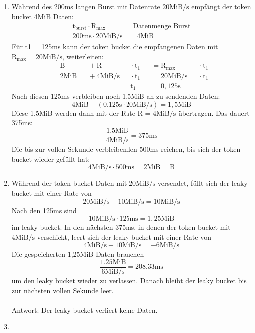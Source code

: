 \documentclass[a4paper,
			llpt,
			solution,
			accentcolor=tud2d,
			colorbacktitle
			]
			{tudexercise}
\newcommand{\MiBs}{\mathrm{MiB}/\mathrm{s}}
\begin{document}
\subsection{}
\begin{enumerate}
\item
\begin{multicols}{2}
Während des 200ms langen Burst mit Datenrate $20\MiBs$ empfängt der token bucket 4MiB Daten: 
\begin{align*}
\text{t}_\text{burst}  \cdot \text{R}_\text{max} &= \text{Datenmenge Burst}
\\
200\mathrm{ms} \cdot 20\MiBs &= \mathrm{4MiB}
\end{align*}
Für t1 = 125ms kann der token bucket die empfangenen Daten mit $\mathrm{R}_{\mathrm{max}} = 20\MiBs$, weiterleiten:
\begin{alignat*}{5}
&\mathrm{B}     &&{}+ \mathrm{R} &&{}\cdot  \mathrm{t}_1 &&{}= \mathrm{R}_{\mathrm{max}} &&{}\cdot  \mathrm{t}_1 \\ 
& 2\mathrm{MiB} &&{}+ 4\MiBs &&{}\cdot   \mathrm{t}_1 &&{}= 20\MiBs &&{}\cdot  \mathrm{t}_1\\
&               &&{}         &&{}      \mathrm{t}_1 &&{}= 0,125\mathrm{s} &&{}
\end{alignat*}
Nach diesen 125ms verbleiben noch 1.5MiB an zu sendenden Daten:
$$4\mathrm{MiB} - \left(0.125\mathrm{s} \cdot 20\MiBs\right) = 1,5 \mathrm{MiB}$$
Diese 1.5MiB werden dann mit der Rate R = $4\MiBs
$
übertragen. Das dauert 375ms:
$$
\frac{1.5 \mathrm{MiB}}{ 4 \MiBs} = 375\mathrm{ms}
$$
Die bis zur vollen Sekunde verbleibenden 500ms reichen, bis sich der token bucket wieder gefüllt hat: 
$$
4\MiBs \cdot 500\mathrm{ms} = 2\mathrm{MiB} = \mathrm{B}
$$
\vfill
\columnbreak
{}
\end{multicols}
\newpage
\item
Während der token bucket Daten mit $20\MiBs$ versendet, füllt sich der leaky bucket mit einer Rate von
$$
20 \MiBs - 10\MiBs = 10\MiBs
$$
Nach den 125ms sind
$$
10\MiBs  \cdot 125\mathrm{ms} = 1,25 \mathrm{MiB}
$$ im leaky bucket.
In den nächsten 375ms, in denen der token bucket mit $4\MiBs$ verschickt, leert sich der leaky bucket mit einer Rate von
$$
4\MiBs - 10\MiBs = -6 \MiBs
$$
Die gespeicherten 1,25MiB Daten brauchen
$$
\frac{1.25\mathrm{MiB}}{6\MiBs} = 208.33\mathrm{ms}
$$
um den leaky bucket wieder zu verlassen.
Danach bleibt der leaky bucket bis zur nächsten vollen Sekunde leer.
\\\\
Antwort: Der leaky bucket verliert keine Daten.
\item


\end{enumerate}
\end{document}
